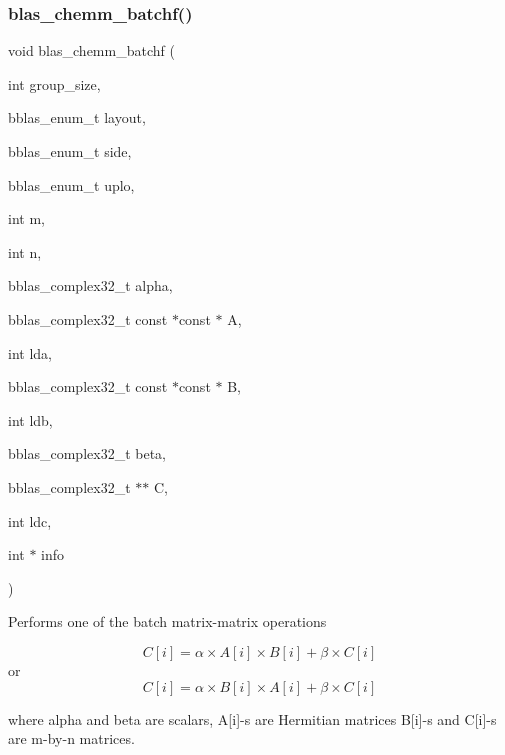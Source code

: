 \subsubsection{\texorpdfstring{blas\+\_\+chemm\+\_\+batchf()}{blas\_chemm\_batchf()}}
{\footnotesize\ttfamily void blas\+\_\+chemm\+\_\+batchf (\begin{DoxyParamCaption}\item[{int}]{group\+\_\+size,  }\item[{bblas\+\_\+enum\+\_\+t}]{layout,  }\item[{bblas\+\_\+enum\+\_\+t}]{side,  }\item[{bblas\+\_\+enum\+\_\+t}]{uplo,  }\item[{int}]{m,  }\item[{int}]{n,  }\item[{bblas\+\_\+complex32\+\_\+t}]{alpha,  }\item[{bblas\+\_\+complex32\+\_\+t const $\ast$const $\ast$}]{A,  }\item[{int}]{lda,  }\item[{bblas\+\_\+complex32\+\_\+t const $\ast$const $\ast$}]{B,  }\item[{int}]{ldb,  }\item[{bblas\+\_\+complex32\+\_\+t}]{beta,  }\item[{bblas\+\_\+complex32\+\_\+t $\ast$$\ast$}]{C,  }\item[{int}]{ldc,  }\item[{int $\ast$}]{info }\end{DoxyParamCaption})}

Performs one of the batch matrix-\/matrix operations

\[ C[i] = \alpha \times A[i] \times B[i] + \beta \times C[i] \] or \[ C[i] = \alpha \times B[i] \times A[i] + \beta \times C[i] \]

where alpha and beta are scalars, A\mbox{[}i\mbox{]}-\/s are Hermitian matrices B\mbox{[}i\mbox{]}-\/s and C\mbox{[}i\mbox{]}-\/s are m-\/by-\/n matrices.


